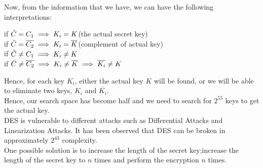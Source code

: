 \documentclass[11pt]{article}
\begin{document}
Now, from the information that we have, we can have the following interpretations:
\begin{center}
    if $\Tilde{C} = C_1 \implies K_i = K$(the actual secret key)\\
    \vspace{1mm}
    if $\Tilde{C} = \overline{C_2} \implies K_i = \overline{K}$(complement of actual key)\\
    \vspace{1mm}
    if $\Tilde{C} \neq C_1 \implies K_i \neq K$\\
    \vspace{1mm}
    if $\Tilde{C} \neq \overline{C_2} \implies K_i \neq \overline{K} \implies \overline{K_i} \neq K$
\end{center}
Hence, for each key $K_i$, either the actual key $K$ will be found, or we will be able to eliminate two keys, $K_i$ and $\overline{K_i}$. 
\\
Hence, our search space has become half and we need to search for $2^{55}$ keys to get the actual key.\\
\vspace{5mm}
DES is vulnerable to  different attacks such as Differential Attacks and Linearization Attacks. It has been observed that DES can be broken in approximately $2^{43}$ complexity. \\
One possible solution is to increase the length of the secret key;increase the length of the secret key to $n$ times and perform the encryption $n$ times.
\end{document}
